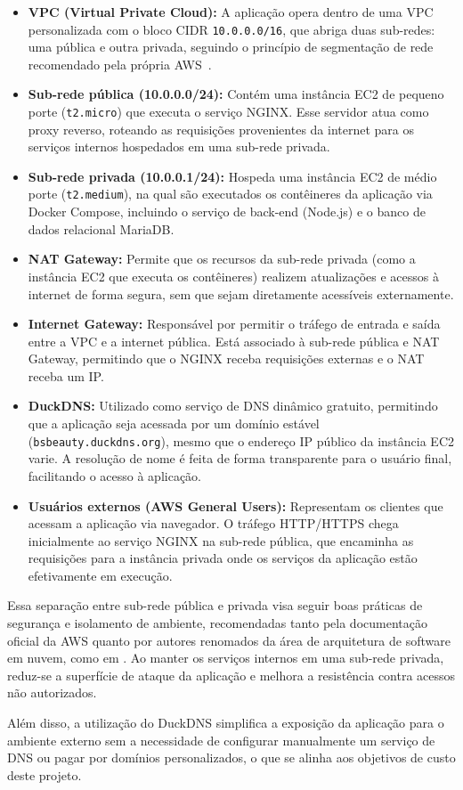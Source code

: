 \begin{itemize}
  \item \textbf{VPC (Virtual Private Cloud):} A aplicação opera dentro de uma VPC personalizada com o bloco CIDR \texttt{10.0.0.0/16}, que abriga duas sub-redes: uma pública e outra privada, seguindo o princípio de segmentação de rede recomendado pela própria AWS~\cite{AWSBestPractices}.

  \item \textbf{Sub-rede pública (10.0.0.0/24):} Contém uma instância EC2 de pequeno porte (\texttt{t2.micro}) que executa o serviço NGINX. Esse servidor atua como proxy reverso, roteando as requisições provenientes da internet para os serviços internos hospedados em uma sub-rede privada.

  \item \textbf{Sub-rede privada (10.0.0.1/24):} Hospeda uma instância EC2 de médio porte (\texttt{t2.medium}), na qual são executados os contêineres da aplicação via Docker Compose, incluindo o serviço de back-end (Node.js) e o banco de dados relacional MariaDB.

  \item \textbf{NAT Gateway:} Permite que os recursos da sub-rede privada (como a instância EC2 que executa os contêineres) realizem atualizações e acessos à internet de forma segura, sem que sejam diretamente acessíveis externamente.

  \item \textbf{Internet Gateway:} Responsável por permitir o tráfego de entrada e saída entre a VPC e a internet pública. Está associado à sub-rede pública e NAT Gateway, permitindo que o NGINX receba requisições externas e o NAT receba um IP.

  \item \textbf{DuckDNS:} Utilizado como serviço de DNS dinâmico gratuito, permitindo que a aplicação seja acessada por um domínio estável (\texttt{bsbeauty.duckdns.org}), mesmo que o endereço IP público da instância EC2 varie. A resolução de nome é feita de forma transparente para o usuário final, facilitando o acesso à aplicação.

  \item \textbf{Usuários externos (AWS General Users):} Representam os clientes que acessam a aplicação via navegador. O tráfego HTTP/HTTPS chega inicialmente ao serviço NGINX na sub-rede pública, que encaminha as requisições para a instância privada onde os serviços da aplicação estão efetivamente em execução.
\end{itemize}

Essa separação entre sub-rede pública e privada visa seguir boas práticas de segurança e isolamento de ambiente, recomendadas tanto pela documentação oficial da AWS quanto por autores renomados da área de arquitetura de software em nuvem, como em \cite{AWSBestPractices}. Ao manter os serviços internos em uma sub-rede privada, reduz-se a superfície de ataque da aplicação e melhora a resistência contra acessos não autorizados.

Além disso, a utilização do DuckDNS simplifica a exposição da aplicação para o ambiente externo sem a necessidade de configurar manualmente um serviço de DNS ou pagar por domínios personalizados, o que se alinha aos objetivos de custo deste projeto.